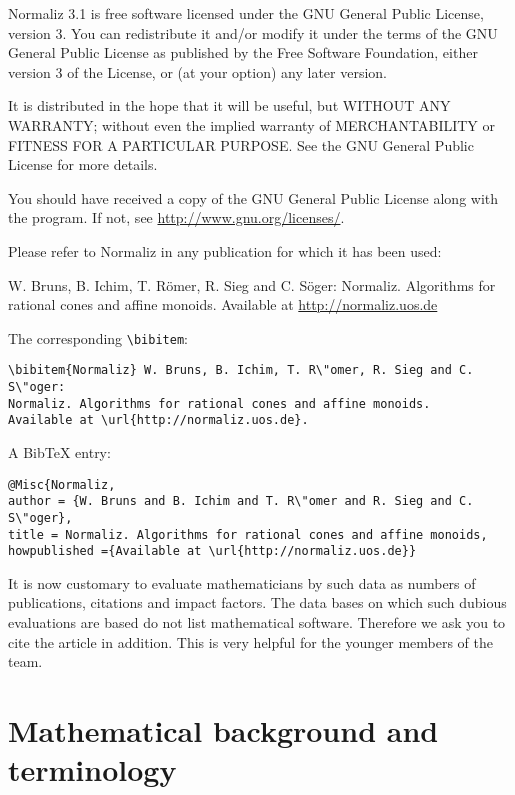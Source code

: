 \documentclass[12pt,a4paper]{scrartcl}
\theoremstyle{definition}
\begin{document}
Normaliz 3.1 is free software licensed under the GNU General
Public License, version 3. You can redistribute it and/or
modify it under the terms of the GNU General Public License as
published by the Free Software Foundation, either version 3 of
the License, or (at your option) any later version.

It is distributed in the hope that it will be useful, but
WITHOUT ANY WARRANTY; without even the implied warranty of
MERCHANTABILITY or FITNESS FOR A PARTICULAR PURPOSE. See the
GNU General Public License for more details.

You should have received a copy of the GNU General Public
License along with the program. If not, see
\url{http://www.gnu.org/licenses/}.

Please refer to Normaliz in any publication for which it has
been used:
\begin{center}
	W. Bruns, B. Ichim, T. R\"omer, R. Sieg and C. S\"oger: Normaliz. Algorithms for
	rational cones and affine monoids. Available at
	\url{http://normaliz.uos.de}
\end{center}
The corresponding \verb|\bibitem|:
\begin{Verbatim}
\bibitem{Normaliz} W. Bruns, B. Ichim, T. R\"omer, R. Sieg and C. S\"oger:
Normaliz. Algorithms for rational cones and affine monoids.
Available at \url{http://normaliz.uos.de}.
\end{Verbatim}

A BibTeX entry:
\begin{Verbatim}
@Misc{Normaliz,
author = {W. Bruns and B. Ichim and T. R\"omer and R. Sieg and C. S\"oger},
title = Normaliz. Algorithms for rational cones and affine monoids,
howpublished ={Available at \url{http://normaliz.uos.de}}
\end{Verbatim}

It is now customary to evaluate mathematicians by such data as
numbers of publications, citations and impact factors. The data
bases on which such dubious evaluations are based do not list
mathematical software. Therefore we ask you to cite the article
\cite{BIS} in addition. This is very helpful for the younger
members of the team.

\newpage

\appendix

\section{Mathematical background and terminology}
\end{document}
